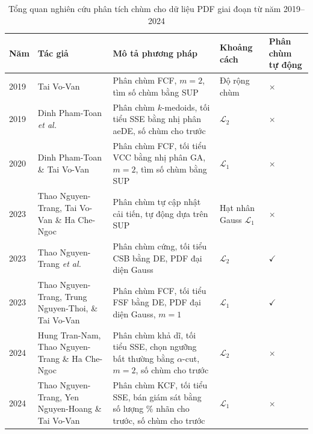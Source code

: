 \documentclass[a4paper,oneside]{book} %
\theoremstyle{plain}
\theoremstyle{plain}
\theoremstyle{nonumberplain}
\begin{document}


\begin{table}
	\centering
				\fontsize{11pt}{14pt}\selectfont
	\caption{Tổng quan nghiên cứu phân tích chùm cho dữ liệu PDF giai đoạn từ năm 2019--2024}
	\begin{tabular*}{\textwidth}{@{\extracolsep\fill}lp{3cm}p{5.5cm}p{3cm}p{2cm}@{\extracolsep\fill}} 
		\toprule
		\textbf{Năm} & \textbf{Tác giả} & \textbf{Mô tả phương pháp} & \textbf{Khoảng cách} & \textbf{Phân chùm tự động} \\
		\midrule
		2019 & Tai Vo-Van \cite{vovan2019cluster} & Phân chùm FCF, $m=2$, tìm số chùm bằng SUP & Độ rộng chùm & $\times$ \\
		2019 & Dinh Pham-Toan \textit{et al.} \cite{pham2019new} & Phân chùm $k$-medoids, tối tiểu SSE bằng nhị phân aeDE, số chùm cho trước & $\mathcal{L}_2$ & $\times$   \\
		2020 & Dinh Pham-Toan \& Tai Vo-Van \cite{phamtoan2022automatic}& Phân chùm FCF, tối tiểu VCC bằng nhị phân GA, $m=2$, tìm số chùm bằng SUP   & $\mathcal{L}_1$ &  $\times$ \\
		2023 & Thao Nguyen-Trang, Tai Vo-Van  \& Ha Che-Ngoc \cite{nguyen2024efficient} & Phân chùm tự cập nhật cải tiến, tự động dựa trên SUP &  Hạt nhân Gauss $\mathcal{L}_1$ & $\times$ \\
		2023 & Thao Nguyen-Trang \textit{et al.} \cite{nguyen2023balance} & Phân chùm cứng, tối tiểu CSB bằng DE, PDF đại diện Gauss  & $\mathcal{L}_2$ & $\checkmark$ \\
		2023 & Thao Nguyen-Trang, Trung Nguyen-Thoi, \& Tai Vo-Van \cite{nguyen2023globally} & Phân chùm FCF, tối tiểu FSF bằng DE, PDF đại diện Gauss, $m=1$ & $\mathcal{L}_1$ & $\checkmark$ \\
		2024 & Hung Tran-Nam, Thao Nguyen-Trang \& Ha Che-Ngoc \cite{tran2024new} & Phân chùm khả dĩ, tối tiểu SSE, chọn ngưỡng bất thường bằng $\alpha$-cut, $m=2$, số chùm cho trước  & $\mathcal{L}_2$ &  $\times$\\
		2024 &Thao Nguyen-Trang, Yen Nguyen-Hoang \& Tai Vo-Van \cite{nguyen2024new} & Phân chùm KCF, tối tiểu SSE, bán giám sát bằng số lượng \% nhãn cho trước, số chùm cho trước & $\mathcal{L}_1$ & $\times$ \\

\end{tabular*}
\end{table}
\end{document}
